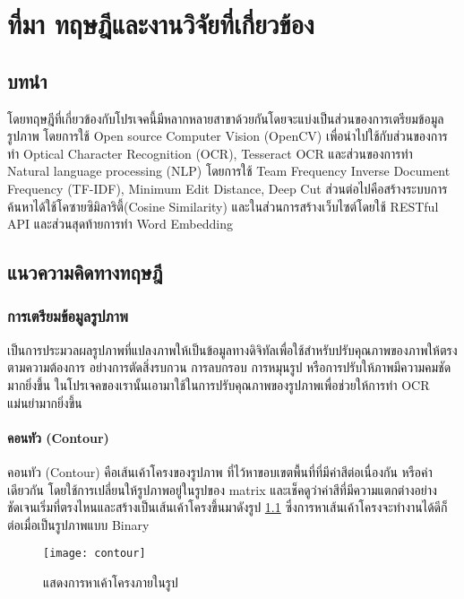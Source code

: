 \chapter{ที่มา ทฤษฎีและงานวิจัยที่เกี่ยวข้อง}
\section{บทนำ}

โดยทฤษฎีที่เกี่ยวข้องกับโปรเจคนี้มีหลากหลายสาขาด้วยกันโดยจะแบ่งเป็นส่วนของการเตรียมข้อมูลรูปภาพ โดยการใช้ Open source Computer Vision (OpenCV) เพื่อนำไปใช้กับส่วนของการทำ Optical Character Recognition (OCR), Tesseract OCR และส่วนของการทำ Natural language processing (NLP) โดยการใช้ Team Frequency Inverse Document Frequency (TF-IDF), Minimum Edit Distance,  Deep Cut ส่วนต่อไปคือสร้างระบบการค้นหาได้ใช้โคซายซิมิลาริตี้(Cosine Similarity) และในส่วนการสร้างเว็บไซต์โดยใช้ RESTful API และส่วนสุดท้ายการทำ Word Embedding 

\section{แนวความคิดทางทฤษฎี}

\subsection{การเตรียมข้อมูลรูปภาพ}

เป็นการประมวลผลรูปภาพที่แปลงภาพให้เป็นข้อมูลทางดิจิทัลเพื่อใช้สำหรับปรับคุณภาพของภาพให้ตรงตามความต้องการ อย่างการตัดสิ่งรบกวน การลบกรอบ การหมุนรูป หรือการปรับให้ภาพมีความคมชัดมากยิ่งขึ้น ในโปรเจคของเรานั้นเอามาใช้ในการปรับคุณภาพของรูปภาพเพื่อช่วยให้การทำ OCR แม่นยำมากยิ่งขึ้น 

\subsubsection{คอนทัว (Contour) }

คอนทัว (Contour) \cite{doxygen} คือเส้นเค้าโครงของรูปภาพ ที่ไว้หาขอบเขตพื้นที่ที่มีค่าสีต่อเนื่องกัน หรือค่าเดียวกัน โดยใช้การเปลี่ยนให้รูปภาพอยู่ในรูปของ matrix และเช็คดูว่าค่าสีที่มีความแตกต่างอย่างชัดเจนเริ่มที่ตรงไหนและสร้างเป็นเส้นเค้าโครงขึ้นมาดังรูป \ref{fig:contour} ซึ่งการหาเส้นเค้าโครงจะทำงานได้ดีก็ต่อเมื่อเป็นรูปภาพแบบ Binary 

\begin{figure}[!h]
    \centering
    \texttt{[image: contour]}
    \caption{แสดงการหาเค้าโครงภายในรูป}\label{fig:contour}
\end{figure}

